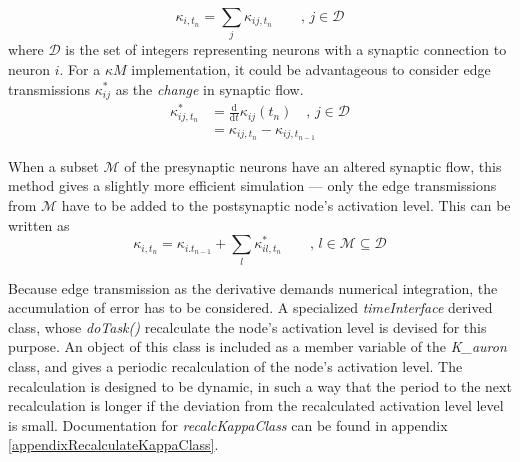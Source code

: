 \begin{equation}
	\kappa_{i, t_n} = \sum_j \kappa_{ij, t_n} \qquad, \, j\in \mathcal{D}
	\nonumber
\end{equation}
		where $\mathcal{D}$ is the set of integers representing neurons with a synaptic connection to neuron $i$.
		For a $\kappa M$ implementation, it could be advantageous to consider edge transmissions $\kappa_{ij}^*$ as the \emph{change} in synaptic flow. %
\begin{equation}
	\begin{split}
		\kappa_{ij,t_n}^* 	&= \frac{\mathrm{d}}{\mathrm{d}t} {\kappa}_{ij}(t_n) \quad, \, j\in \mathcal{D} \\
							& = \kappa_{ij,t_{n}} - \kappa_{ij,t_{n-1}} 
	\end{split}
\end{equation}
		
		When a subset $\mathcal{M}$ of the presynaptic neurons have an altered synaptic flow, this method gives a slightly more efficient simulation ---
			only the edge transmissions from $\mathcal{M}$ have to be added to the postsynaptic node's activation level.
		This can be written as
\begin{equation}
	\kappa_{i, t_n} = \kappa_{i. t_{n-1}} + \sum_l \kappa_{il, t_n}^* \qquad,\, l\in \mathcal{M} \subseteq \mathcal{D}
\end{equation}

		Because edge transmission as the derivative demands numerical integration, the accumulation of error has to be considered.
		A specialized \emph{timeInterface} derived class, whose \emph{doTask()} recalculate the node's activation level is devised for this purpose.
		An object of this class is included as a member variable of the \emph{K\_auron} class, and gives a periodic recalculation of the node's activation level.
		The recalculation is designed to be dynamic, in such a way that the period to the next recalculation is longer if the deviation from the recalculated activation level level is small.
		Documentation for \emph{recalcKappaClass} can be found in appendix \ref{appendixRecalculateKappaClass}.
		



